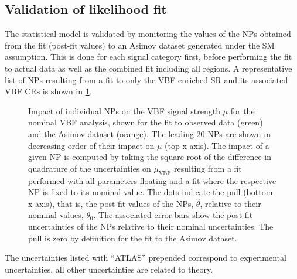 \subsection{Validation of likelihood fit}
The statistical model is validated by monitoring the values of the NPs obtained from the fit (post-fit values) to an Asimov dataset generated under the SM assumption. 
This is done for each signal category first, before performing the fit to actual data as well as the combined fit including all regions. A representative list of NPs resulting from a fit to only the VBF-enriched \TwoJet SR and its associated VBF CRs is shown in \cref{fig:fit:breakdown}. 
\begin{figure}[th]
    \centering
    {\caption{Impact of individual NPs on the VBF signal strength $\mu$ for the nominal VBF analysis, shown for the fit to observed data (green) and the Asimov dataset (orange). The leading 20 NPs are shown in decreasing order of their impact on $\mu$ (top x-axis).
    The impact of a given NP is computed by taking the square root of the difference in quadrature of the uncertainties on $\mu_{\mathrm{VBF}}$ resulting from a fit performed with all parameters floating and a fit where the respective NP is fixed to its nominal value. 
    The dots indicate the pull (bottom x-axis), that is, the post-fit values of the NPs, $\hat{\theta}$, relative to their nominal values, $\theta_0$. 
    The associated error bars show the post-fit uncertainties of the NPs relative to their nominal uncertainties. 
    The pull is zero by definition for the fit to the Asimov dataset.
    \label{fig:fit:breakdown} }}
\end{figure}
The uncertainties listed with ``ATLAS'' prepended correspond to experimental uncertainties, all other uncertainties are related to theory. 
